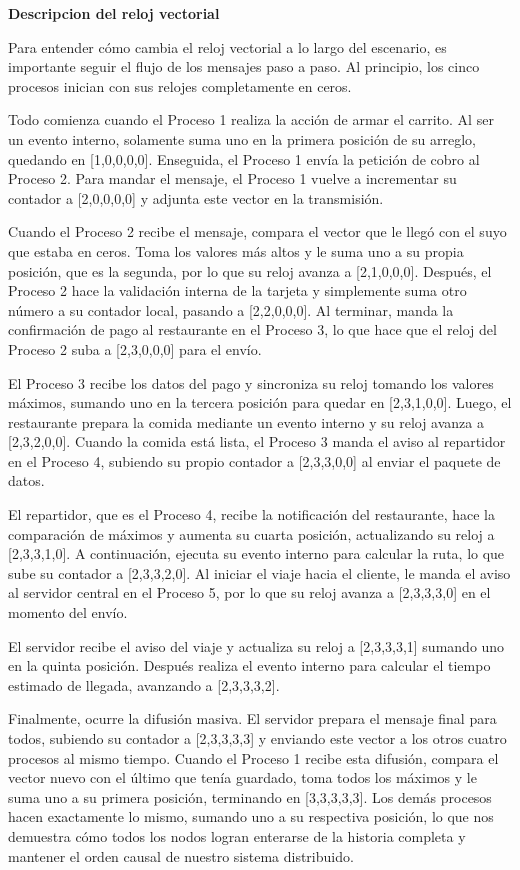 \documentclass[letterpaper,11pt]{article}
\begin{document}
\textbf{Descripcion del reloj vectorial}

Para entender cómo cambia el reloj vectorial a lo largo del escenario, es importante seguir el flujo de los mensajes paso a paso. Al principio, los cinco procesos inician con sus relojes completamente en ceros. 

Todo comienza cuando el Proceso 1 realiza la acción de armar el carrito. Al ser un evento interno, solamente suma uno en la primera posición de su arreglo, quedando en [1,0,0,0,0]. Enseguida, el Proceso 1 envía la petición de cobro al Proceso 2. Para mandar el mensaje, el Proceso 1 vuelve a incrementar su contador a [2,0,0,0,0] y adjunta este vector en la transmisión. 

Cuando el Proceso 2 recibe el mensaje, compara el vector que le llegó con el suyo que estaba en ceros. Toma los valores más altos y le suma uno a su propia posición, que es la segunda, por lo que su reloj avanza a [2,1,0,0,0]. Después, el Proceso 2 hace la validación interna de la tarjeta y simplemente suma otro número a su contador local, pasando a [2,2,0,0,0]. Al terminar, manda la confirmación de pago al restaurante en el Proceso 3, lo que hace que el reloj del Proceso 2 suba a [2,3,0,0,0] para el envío.

El Proceso 3 recibe los datos del pago y sincroniza su reloj tomando los valores máximos, sumando uno en la tercera posición para quedar en [2,3,1,0,0]. Luego, el restaurante prepara la comida mediante un evento interno y su reloj avanza a [2,3,2,0,0]. Cuando la comida está lista, el Proceso 3 manda el aviso al repartidor en el Proceso 4, subiendo su propio contador a [2,3,3,0,0] al enviar el paquete de datos.

El repartidor, que es el Proceso 4, recibe la notificación del restaurante, hace la comparación de máximos y aumenta su cuarta posición, actualizando su reloj a [2,3,3,1,0]. A continuación, ejecuta su evento interno para calcular la ruta, lo que sube su contador a [2,3,3,2,0]. Al iniciar el viaje hacia el cliente, le manda el aviso al servidor central en el Proceso 5, por lo que su reloj avanza a [2,3,3,3,0] en el momento del envío.

El servidor recibe el aviso del viaje y actualiza su reloj a [2,3,3,3,1] sumando uno en la quinta posición. Después realiza el evento interno para calcular el tiempo estimado de llegada, avanzando a [2,3,3,3,2]. 

Finalmente, ocurre la difusión masiva. El servidor prepara el mensaje final para todos, subiendo su contador a [2,3,3,3,3] y enviando este vector a los otros cuatro procesos al mismo tiempo. Cuando el Proceso 1 recibe esta difusión, compara el vector nuevo con el último que tenía guardado, toma todos los máximos y le suma uno a su primera posición, terminando en [3,3,3,3,3]. Los demás procesos hacen exactamente lo mismo, sumando uno a su respectiva posición, lo que nos demuestra cómo todos los nodos logran enterarse de la historia completa y mantener el orden causal de nuestro sistema distribuido.
\end{document}
